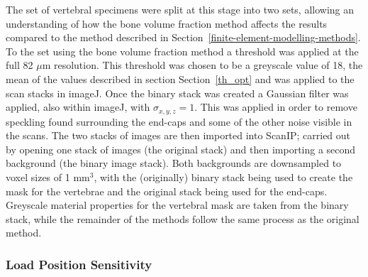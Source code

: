 The set of vertebral specimens were split at this stage into two sets, allowing
an understanding of how the bone volume fraction method affects the results compared to the method described in Section~\ref{finite-element-modelling-methods}.
To the set using the bone volume fraction method a threshold was applied at the full 82 $\mu$m resolution.
This threshold was chosen to be a greyscale value of 18, the mean of the values described in section Section~\ref{th_opt} and was applied to the scan stacks in imageJ.
Once the binary stack was created a Gaussian filter was applied, also within imageJ, with $
\sigma_{x,y,z} = 1 $.
This was applied in order to remove speckling found surrounding the end-caps and some of the other noise visible in the scans.
The two stacks of images are then imported into ScanIP; carried
out by opening one stack of images (the original stack) and then importing a
second background (the binary image stack). Both backgrounds are downsampled to
voxel sizes of 1 mm$^3$, with the (originally) binary stack being used to create
the mask for the vertebrae and the original stack being used for the end-caps.
Greyscale material properties for the vertebral mask are taken from the binary
stack, while the remainder of the methods follow the same process as the
original method.






\subsubsection{Load Position Sensitivity}

